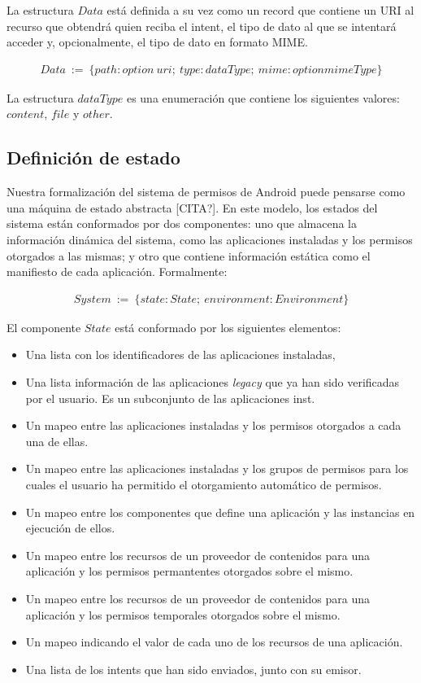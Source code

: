 La estructura $Data$ está definida a su vez como un record que contiene un URI al recurso que obtendrá
quien reciba el intent, el tipo de dato al que se intentará acceder y, opcionalmente, el tipo de dato en
formato MIME.

\begin{align*}
    Data\ :=\ \{ path: option\ uri;\ type: dataType;\ mime: option mimeType \}
\end{align*}

La estructura $dataType$ es una enumeración que contiene los siguientes valores: $content$, $file$ y
$other$.


\subsection{Definición de estado}
Nuestra formalización del sistema de permisos de Android puede pensarse como una máquina de estado
abstracta [CITA?]. En este modelo, los estados del sistema están conformados por dos componentes: uno
que almacena la información dinámica del sistema, como las aplicaciones instaladas y los permisos otorgados
a las mismas; y otro que contiene información estática como el manifiesto de cada aplicación. Formalmente:

\begin{align*}
    System\ :=\ \{ state: State;\ environment: Environment \}
\end{align*}


El componente $State$ está conformado por los siguientes elementos:

\begin{itemize}
    \item Una lista con los identificadores de las aplicaciones instaladas,
    \item Una lista  información de las aplicaciones \textit{legacy} que ya han sido verificadas por
          el usuario. Es un subconjunto de las aplicaciones inst.
    \item Un mapeo entre las aplicaciones instaladas y los permisos otorgados a cada una de ellas.
    \item Un mapeo entre las aplicaciones instaladas y los grupos de permisos para los cuales el
          usuario ha permitido el otorgamiento automático de permisos.
    \item Un mapeo entre los componentes que define una aplicación y las instancias en ejecución de
          ellos.
    \item Un mapeo entre los recursos de un proveedor de contenidos para una aplicación y los permisos
          permantentes otorgados sobre el mismo.
    \item Un mapeo entre los recursos de un proveedor de contenidos para una aplicación y los permisos
          temporales otorgados sobre el mismo.
    \item Un mapeo indicando el valor de cada uno de los recursos de una aplicación.
    \item Una lista de los intents que han sido enviados, junto con su emisor.
\end{itemize}

